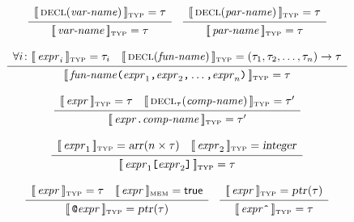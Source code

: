 \documentclass[10pt]{article}
\begin{document}
$$ \begin{array}{c}
   \typattr{\mbox{\textsc{decl}}(\nont{var-name})} = \tau
   \\[2pt]\hline\\[-10pt]
   \typattr{\nont{var-name}} = \tau
   \end{array}
  \quad
   \begin{array}{c}
   \typattr{\mbox{\textsc{decl}}(\nont{par-name})} = \tau
   \\[2pt]\hline\\[-10pt]
   \typattr{\nont{par-name}} = \tau
   \end{array} $$

$$ \begin{array}{c}
   \forall i\colon [\![\,\mbox{\textit{expr}}_i\,]\!]_{\mbox{\tiny TYP}} = \tau_i \quad
   [\![\,\mbox{\textsc{decl}}(\mbox{\textit{fun-name}})\,]\!]_{\mbox{\tiny TYP}} = (\tau_1,\tau_2,\ldots,\tau_n)\rightarrow\tau
   \\[2pt]\hline\\[-10pt]
   [\![\,\mbox{\textit{fun-name}}\mbox{\texttt{(}}\mbox{\textit{expr}}_1\mbox{\texttt{,}}\mbox{\textit{expr}}_2\mbox{\texttt{,}}\ldots\mbox{\texttt{,}}\mbox{\textit{expr}}_n\mbox{\texttt{)}}\,]\!]_{\mbox{\tiny TYP}} = \tau
   \end{array} $$

$$ \begin{array}{c}
   [\![\,\mbox{\textit{expr}}\,]\!]_{\mbox{\tiny TYP}} = \tau \quad [\![\,\mbox{\textsc{decl}}_\tau(\mbox{\textit{comp-name}})\,]\!]_{\mbox{\tiny TYP}} = \tau'
   \\[2pt]\hline\\[-10pt]
   [\![\,\mbox{\textit{expr}}\mbox{\texttt{.}}\mbox{\textit{comp-name}}\,]\!]_{\mbox{\tiny TYP}} = \tau'
   \end{array} $$

$$ \begin{array}{c}
   [\![\,\mbox{\textit{expr}}_1\,]\!]_{\mbox{\tiny TYP}} = \mbox{\textsl{arr}}(n\times\tau) \quad 
   [\![\,\mbox{\textit{expr}}_2\,]\!]_{\mbox{\tiny TYP}} = \mbox{\textsl{integer}}
   \\[2pt]\hline\\[-10pt]
   [\![\,\mbox{\textit{expr}}_1\mbox{\texttt{[}}\mbox{\textit{expr}}_2\mbox{\texttt{]}}\,]\!]_{\mbox{\tiny TYP}} = \tau
   \end{array} $$

$$ \begin{array}{c}
   \typattr{\nont{expr}} = \tau \quad
   \memattr{\nont{expr}} = \mbox{\textsf{true}}
   \\[2pt]\hline\\[-10pt]
   \typattr{\term{@}\nont{expr}} = \type{ptr}(\tau)
   \end{array}
  \quad
   \begin{array}{c}
   \typattr{\nont{expr}} = \type{ptr}(\tau)
   \\[2pt]\hline\\[-10pt]
   \typattr{\nont{expr}\term{\^}} = \tau
   \end{array} $$
\end{document}
